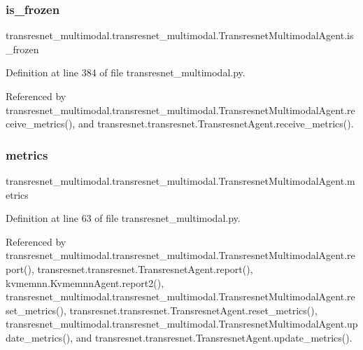 \subsubsection{\texorpdfstring{is\+\_\+frozen}{is\_frozen}}
{\footnotesize\ttfamily transresnet\+\_\+multimodal.\+transresnet\+\_\+multimodal.\+Transresnet\+Multimodal\+Agent.\+is\+\_\+frozen}



Definition at line 384 of file transresnet\+\_\+multimodal.\+py.



Referenced by transresnet\+\_\+multimodal.\+transresnet\+\_\+multimodal.\+Transresnet\+Multimodal\+Agent.\+receive\+\_\+metrics(), and transresnet.\+transresnet.\+Transresnet\+Agent.\+receive\+\_\+metrics().

\mbox{\label{classtransresnet__multimodal_1_1transresnet__multimodal_1_1TransresnetMultimodalAgent_a06001606cc178b20680cacf41f261d18}} 
\subsubsection{\texorpdfstring{metrics}{metrics}}
{\footnotesize\ttfamily transresnet\+\_\+multimodal.\+transresnet\+\_\+multimodal.\+Transresnet\+Multimodal\+Agent.\+metrics}



Definition at line 63 of file transresnet\+\_\+multimodal.\+py.



Referenced by transresnet\+\_\+multimodal.\+transresnet\+\_\+multimodal.\+Transresnet\+Multimodal\+Agent.\+report(), transresnet.\+transresnet.\+Transresnet\+Agent.\+report(), kvmemnn.\+Kvmemnn\+Agent.\+report2(), transresnet\+\_\+multimodal.\+transresnet\+\_\+multimodal.\+Transresnet\+Multimodal\+Agent.\+reset\+\_\+metrics(), transresnet.\+transresnet.\+Transresnet\+Agent.\+reset\+\_\+metrics(), transresnet\+\_\+multimodal.\+transresnet\+\_\+multimodal.\+Transresnet\+Multimodal\+Agent.\+update\+\_\+metrics(), and transresnet.\+transresnet.\+Transresnet\+Agent.\+update\+\_\+metrics().

